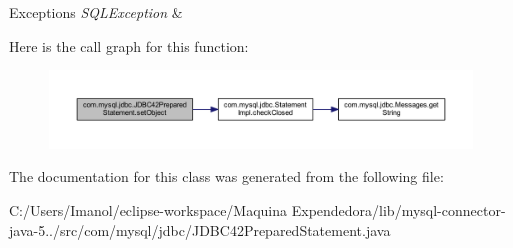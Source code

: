 \begin{DoxyExceptions}{Exceptions}
{\em S\+Q\+L\+Exception} & \\
\hline
\end{DoxyExceptions}
Here is the call graph for this function\+:
\nopagebreak
\begin{figure}[H]
\begin{center}
\leavevmode
\includegraphics[width=350pt]{classcom_1_1mysql_1_1jdbc_1_1_j_d_b_c42_prepared_statement_afd7aa860a6a3a3bf327efd997b82c52f_cgraph}
\end{center}
\end{figure}


The documentation for this class was generated from the following file\+:\begin{DoxyCompactItemize}
\item 
C\+:/\+Users/\+Imanol/eclipse-\/workspace/\+Maquina Expendedora/lib/mysql-\/connector-\/java-\/5../src/com/mysql/jdbc/J\+D\+B\+C42\+Prepared\+Statement.\+java\end{DoxyCompactItemize}

